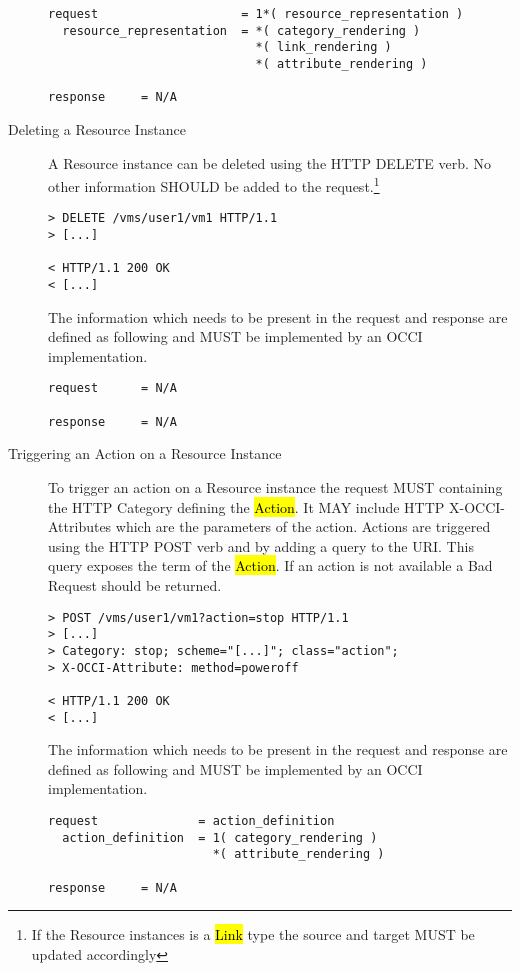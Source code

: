 \documentclass[10pt,a4paper]{article}
\begin{document}
\begin{description}
\begin{verbatim}
request                    = 1*( resource_representation )
  resource_representation  = *( category_rendering )
                             *( link_rendering )
                             *( attribute_rendering )

response     = N/A
\end{verbatim}

  \item[Deleting a Resource Instance] A Resource instance can be
    deleted using the HTTP DELETE verb. No other information SHOULD be
    added to the request.\footnote{If the Resource instances is a
      \hl{Link} type the source and target MUST be updated
      accordingly}

\begin{verbatim}
> DELETE /vms/user1/vm1 HTTP/1.1
> [...]

< HTTP/1.1 200 OK
< [...]
\end{verbatim}

    The information which needs to be present in the request and
    response are defined as following and MUST be implemented by an
    OCCI implementation.

\begin{verbatim}
request      = N/A

response     = N/A
\end{verbatim}

  \item[Triggering an Action on a Resource Instance] To trigger an
    action on a Resource instance the request MUST containing the HTTP
    Category defining the \hl{Action}. It MAY include HTTP
    X-OCCI-Attributes which are the parameters of the action. Actions
    are triggered using the HTTP POST verb and by adding a query to
    the URI. This query exposes the term of the \hl{Action}. If an
    action is not available a Bad Request should be returned.

\begin{verbatim}
> POST /vms/user1/vm1?action=stop HTTP/1.1
> [...]
> Category: stop; scheme="[...]"; class="action";
> X-OCCI-Attribute: method=poweroff

< HTTP/1.1 200 OK
< [...]
\end{verbatim}

    The information which needs to be present in the request and
    response are defined as following and MUST be implemented by an
    OCCI implementation.

\begin{verbatim}
request              = action_definition
  action_definition  = 1( category_rendering )
                       *( attribute_rendering )

response     = N/A
\end{verbatim}

\end{description}
\end{document}
